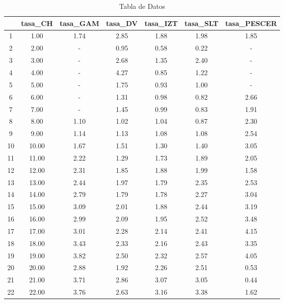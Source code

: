\documentclass[12pt]{article}
\begin{document}
\begin{table}
\centering
\begin{tabular}{|c|c|c|c|c|c|c|}
\hline
 & tasa\_CH & tasa\_GAM & tasa\_DV & tasa\_IZT & tasa\_SLT & tasa\_PESCER \\
\hline
1 & 1.00 & 1.74 & 2.85 & 1.88 & 1.98 & 1.85 \\
2 & 2.00 & - & 0.95 & 0.58 & 0.22 & - \\
3 & 3.00 & - & 2.68 & 1.35 & 2.40 & - \\
4 & 4.00 & - & 4.27 & 0.85 & 1.22 & - \\
5 & 5.00 & - & 1.75 & 0.93 & 1.00 & - \\
6 & 6.00 & - & 1.31 & 0.98 & 0.82 & 2.66 \\
7 & 7.00 & - & 1.45 & 0.99 & 0.83 & 1.91 \\
8 & 8.00 & 1.10 & 1.02 & 1.04 & 0.87 & 2.30 \\
9 & 9.00 & 1.14 & 1.13 & 1.08 & 1.08 & 2.54 \\
10 & 10.00 & 1.67 & 1.51 & 1.30 & 1.40 & 3.05 \\
11 & 11.00 & 2.22 & 1.29 & 1.73 & 1.89 & 2.05 \\
12 & 12.00 & 2.31 & 1.85 & 1.88 & 1.99 & 1.58 \\
13 & 13.00 & 2.44 & 1.97 & 1.79 & 2.35 & 2.53 \\
14 & 14.00 & 2.79 & 1.79 & 1.78 & 2.27 & 3.04 \\
15 & 15.00 & 3.09 & 2.01 & 1.88 & 2.44 & 3.19 \\
16 & 16.00 & 2.99 & 2.09 & 1.95 & 2.52 & 3.48 \\
17 & 17.00 & 3.01 & 2.28 & 2.14 & 2.41 & 4.15 \\
18 & 18.00 & 3.43 & 2.33 & 2.16 & 2.43 & 3.35 \\
19 & 19.00 & 3.82 & 2.50 & 2.32 & 2.57 & 4.05 \\
20 & 20.00 & 2.88 & 1.92 & 2.26 & 2.51 & 0.53 \\
21 & 21.00 & 3.71 & 2.86 & 3.07 & 3.05 & 0.44 \\
22 & 22.00 & 3.76 & 2.63 & 3.16 & 3.38 & 1.62 \\
\hline
\end{tabular}
\caption{Tabla de Datos}
\label{tab:datos3}
\end{table}
\end{document}
